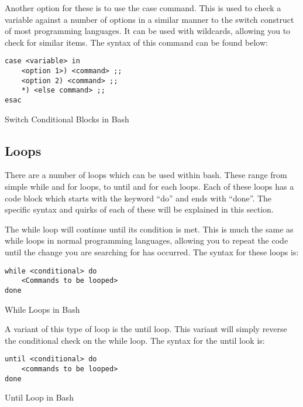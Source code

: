 			Another option for these is to use the case command.
			This is used to check a variable against a number of options in a similar manner to the switch construct of most programming languages.
			It can be used with wildcards, allowing you to check for similar items.
			The syntax of this command can be found below:
			\begin{code}
			\begin{verbatim}
case <variable> in
	<option 1>) <command> ;;
	<option 2) <command> ;;
	*) <else command> ;;
esac
			\end{verbatim}
			\label{code:SwitchConditionalBlock}
			\caption{Switch Conditional Blocks in Bash}
			\end{code}
		\subsection{Loops}
			There are a number of loops which can be used within bash.
			These range from simple while and for loops, to until  and for each loops.
			Each of these loops has a code block which starts with the keyword ``do'' and ends with ``done''.
			The specific syntax and quirks of each of these will be explained in this section.

			The while loop will continue until its condition is met.
			This is much the same as while loops in normal programming languages, allowing you to repeat the code until the change you are searching for has occurred.
			The syntax for these loops is:
			\begin{code}
			\begin{verbatim}
while <conditional> do
	<Commands to be looped>
done
			\end{verbatim}
			\label{code:WhileBashLoops}
			\caption{While Loops in Bash}
			\end{code}
			A variant of this type of loop is the until loop.
			This variant will simply reverse the conditional check on the while loop.
			The syntax for the until look is:
			\begin{code}
			\begin{verbatim}
until <conditional> do
	<commands to be looped>
done
			\end{verbatim}
			\label{code:BashLoopsUntil}
			\caption{Until Loop in Bash}
			\end{code}

